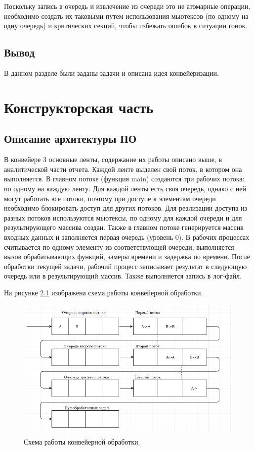 \documentclass[12pt]{report}
\begin{document}
Поскольку запись в очередь и извлечение из очереди это не атомарные операции, необходимо создать их таковыми путем использования мьютексов (по одному на одну очередь) и критических секций, чтобы избежать ошибок в ситуации гонок. 

\section{Вывод}
	В данном разделе были заданы задачи и описана идея конвейеризации.
	
\clearpage

\chapter{Конструкторская часть}

\section{Описание архитектуры ПО}
В конвейере 3 основные ленты, содержание их работы описано выше, в аналитической части отчета. Каждой ленте выделен свой поток, в котором она выполняется. В главном потоке (функция main) создаются три рабочих потока: по одному на каждую ленту. 
Для каждой ленты есть своя очередь, однако с ней могут работать все потоки, поэтому при доступе к элементам очереди необходимо блокировать доступ для других потоков. Для реализации доступа из разных потоков используются мьютексы, по одному для каждой очереди и для результирующего массива создан. 
Также в главном потоке генерируется массив входных данных и заполняется первая очередь (уровень 0).
В рабочих процессах считывается по одному элементу из соответствующей очереди, выполняется вызов обрабатывающих функций, замеры времени и задержка по времени. После обработки текущей задачи, рабочий процесс записывает результат в следующую очередь или в результирующий массив. Также выполняется запись в лог-файл. 

На рисунке \ref{fig:conv_1} изображена схема работы конвейерной обработки.


\begin{figure}[h]
	\includegraphics[scale=0.5]{conv1.png}
	\caption{Схема работы конвейерной обработки.}
	\label{fig:conv_1}
\end{figure}
\end{document}
